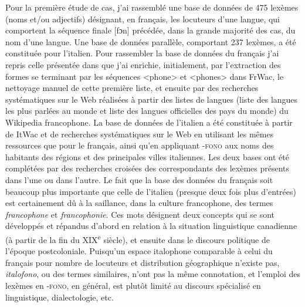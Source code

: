 \documentclass[output=paper]{langsci/langscibook}
\begin{document}
Pour la première étude de cas, j'ai rassemblé une base de données de 475
lexèmes (noms et/ou adjectifs) désignant, en français, les locuteurs
d'une langue, qui comportent la séquence finale {[}fɔn{]} précédée, dans
la grande majorité des cas, du nom d'une langue. Une base de données
parallèle, comportant 237 lexèmes, a été constituée pour l'italien. Pour
rassembler la base de données du français j'ai repris celle présentée
dans %
\citet{Lasserre2016} %
%
que j'ai enrichie, initialement, par l'extraction
des formes se terminant par les séquences \textless{}phone\textgreater{}
et \textless{}phones\textgreater{} dans FrWac, le nettoyage manuel de
cette première liste, et ensuite par des recherches systématiques sur le
Web réalisées à partir des listes de langues (liste des langues les plus
parlées au monde et liste des langues officielles des pays du
monde) du Wikipedia francophone.
La base de données de l'italien a été constituée à partir de ItWac et de
recherches systématiques sur le Web en utilisant les mêmes ressources
que pour le français, ainsi qu'en appliquant \textsc{-fono} aux noms des
habitants des régions et des principales villes italiennes. Les deux
bases ont été complétées par des recherches croisées des correspondants
des lexèmes présents dans l'une ou dans l'autre. Le fait que la base des
données du français soit beaucoup plus importante que celle de l'italien
(presque deux fois plus d'entrées) est certainement dû à la saillance,
dans la culture francophone, des termes \emph{francophone} et
\emph{francophonie}. Ces mots désignent deux concepts qui se sont
développés et répandus d'abord en relation à la situation linguistique
canadienne (à partir de la fin du XIX\textsuperscript{e} siècle), et
ensuite dans le discours politique de l'époque postcoloniale. Puisqu'un
espace italophone comparable à celui du français pour nombre de
locuteurs et distribution géographique n'existe pas, \emph{italofono},
ou des termes similaires, n'ont pas la même connotation, et l'emploi des
lexèmes en \textsc{-fono}, en général, est plutôt limité au discours
spécialisé en linguistique, dialectologie, etc.
\end{document}
